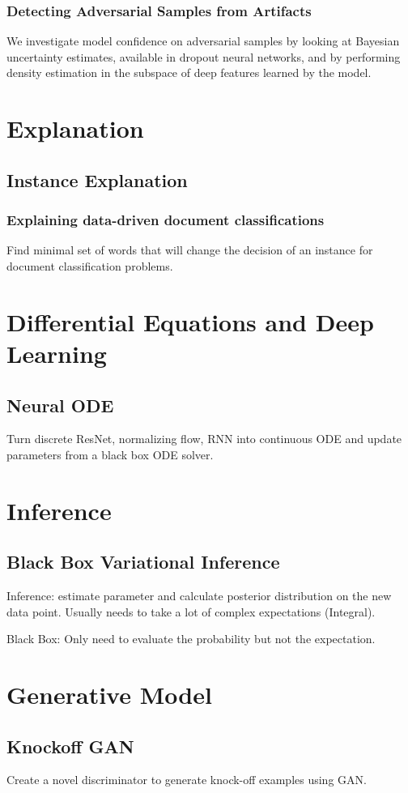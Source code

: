 \documentclass[10pt,a4paper]{article}
\begin{document}
\subsubsection{Detecting Adversarial Samples from Artifacts\cite{feinman2017detecting}}
We investigate model confidence on adversarial samples by looking at Bayesian uncertainty estimates, available in dropout neural networks, and by performing density estimation in the subspace of deep features learned by the model.
\section{Explanation}
\subsection{Instance Explanation}
\subsubsection{	
Explaining data-driven document classifications \cite{martens2013explaining}}
Find minimal set of words that will change the decision of an instance for document classification problems.
\section{Differential Equations and Deep Learning}
\subsection{Neural ODE \cite{chen2018neural}}
Turn discrete ResNet, normalizing flow, RNN into continuous ODE and update parameters from a black box ODE solver.
\section{Inference}
\subsection{Black Box Variational Inference\cite{ranganath2014black}}
Inference: estimate parameter and calculate posterior distribution on the new data point. Usually needs to take a lot of complex expectations (Integral).

Black Box: Only need to evaluate the probability but not the expectation.
\section{Generative Model}
\subsection{Knockoff GAN}
Create a novel discriminator to generate knock-off examples using GAN.


\end{document}
